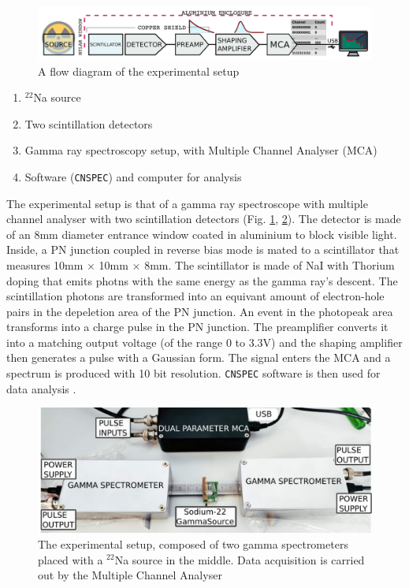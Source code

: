 \begin{figure}[H]
    \centering
    \includegraphics[width=1\columnwidth]{images/setup.png}
    \caption{A flow diagram of the experimental setup}
    \label{setup}
\end{figure}

\begin{enumerate}
    \item $^{22}$Na source
    \item Two scintillation detectors
    \item Gamma ray spectroscopy setup, with Multiple Channel Analyser (MCA)
    \item Software (\verb|CNSPEC|) and computer for analysis\\
\end{enumerate}

The experimental setup is that of a gamma ray spectroscope with multiple channel analyser with two scintillation detectors (Fig. \ref{setup}, \ref{instr}). The detector is made of an 8mm diameter entrance window coated in aluminium to block visible light. Inside, a PN junction coupled in reverse bias mode is mated to a scintillator that measures 10mm $\times$ 10mm $\times$ 8mm. The scintillator is made of NaI with Thorium doping that emits photns with the same energy as the gamma ray's descent. The scintillation photons are transformed into an equivant amount of electron-hole pairs in the depeletion area of the PN junction. An event in the photopeak area transforms into a charge pulse in the PN junction. The preamplifier converts it into a matching output voltage (of the range 0 to 3.3V) and the shaping amplifier then generates a pulse with a Gaussian form. The signal enters the MCA and a spectrum is produced with 10 bit resolution. \verb|CNSPEC| software is then used for data analysis \cite{Jithin_Sastri_2018}.

\begin{figure}[H]
    \centering
    \includegraphics[width=1\columnwidth]{images/instr.png}
    \caption{The experimental setup, composed of two gamma spectrometers placed with a $^{22}$Na source in the middle. Data acquisition is carried out by the Multiple Channel Analyser}
    \label{instr}
\end{figure}

